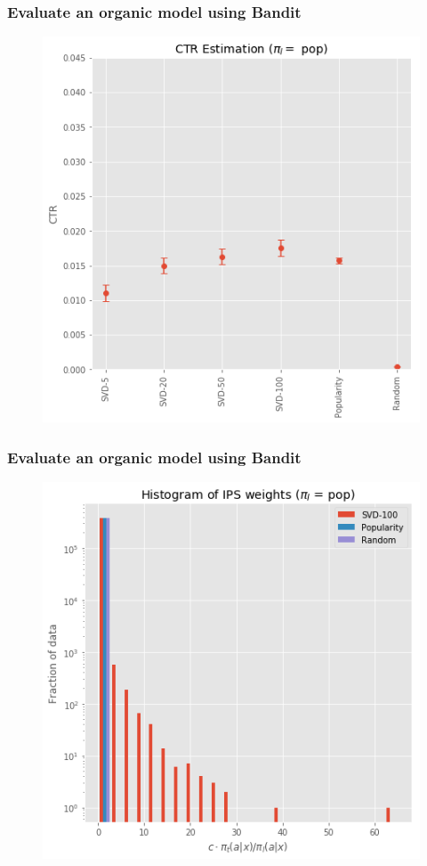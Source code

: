 \begin{frame}
  \frametitle{Evaluate an organic model using Bandit}
\begin{figure}[h!]
\includegraphics[scale=0.4]{images/evalorganicwithbandit5.png}
\centering
\label{motex1}
\end{figure}
\end{frame}

\begin{frame}
  \frametitle{Evaluate an organic model using Bandit}
\begin{figure}[h!]
\includegraphics[scale=0.4]{images/evalorganicwithbandit6.png}
\centering
\label{motex1}
\end{figure}
\end{frame}


